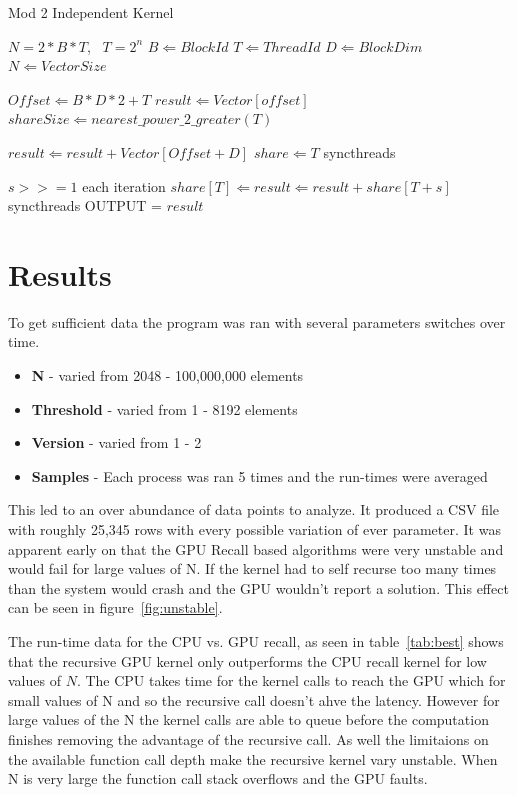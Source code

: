 \documentclass[conference]{IEEEtran}
\begin{document}
\begin{algorithm}
  \caption{Mod 2 Independent Kernel}
  \label{alg:mod2}
  \begin{algorithmic}
    \REQUIRE $N=2*B*T$,~ $T=2^n$
    \STATE $B \Leftarrow BlockId$
    \STATE $T \Leftarrow ThreadId$
    \STATE $D \Leftarrow BlockDim$
    \STATE $N \Leftarrow Vector Size$
    
    \STATE $Offset \Leftarrow B * D * 2 + T$
    \STATE $result \Leftarrow Vector[offset]$
    \STATE $shareSize \Leftarrow nearest\_power\_2\_greater(T)$
    
        \STATE $result \Leftarrow result + Vector[Offset + D]$
    \ENDIF
    \STATE $share \Leftarrow T$
    \STATE syncthreads
    
    \STATE $s >>= 1$ each iteration
            \STATE $share[T] \Leftarrow result \Leftarrow result + share[T + s]$
        \ENDIF
        \STATE syncthreads
    \ENDFOR
      \STATE OUTPUT = $result$
    \ENDIF
    \ENDFOR
  \end{algorithmic}
\end{algorithm}

\section{Results}
To get sufficient data the program was ran with several parameters switches over time. 
\begin{itemize}
  \item \textbf{N} - varied from 2048 - 100,000,000 elements
  \item \textbf{Threshold} - varied from 1 - 8192 elements
  \item \textbf{Version} - varied from 1 - 2
  \item \textbf{Samples} - Each process was ran 5 times and the run-times were averaged
\end{itemize}

This led to an over abundance of data points to analyze. It produced a CSV file with roughly 25,345 rows with every possible variation of ever parameter. It was apparent early on that the GPU Recall based algorithms were very unstable and would fail for large values of N. If the kernel had to self recurse too many times than the system would crash and the GPU wouldn't report a solution. This effect can be seen in figure~\ref{fig:unstable}.

The run-time data for the CPU vs. GPU recall, as seen in table~\ref{tab:best} shows that the recursive GPU kernel only outperforms the CPU recall kernel for low values of $N$. The CPU takes time for the kernel calls to reach the GPU which for small values of N and so the recursive call doesn't ahve the latency. However for large values of the N the kernel calls are able to queue before the computation finishes removing the advantage of the recursive call. As well the limitaions on the available function call depth make the recursive kernel vary unstable. When N is very large the function call stack overflows and the GPU faults.
\end{document}

